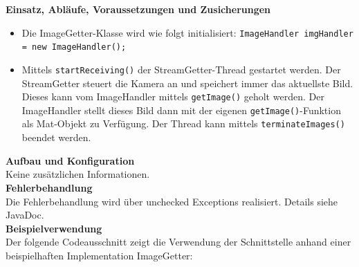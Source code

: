 \noindent
\textbf{Einsatz, Abläufe, Voraussetzungen und Zusicherungen}
\begin{itemize}
	\item{Die ImageGetter-Klasse wird wie folgt initialisiert: 
        \verb?ImageHandler imgHandler = new ImageHandler();? }
	\item{Mittels \verb?startReceiving()? der StreamGetter-Thread gestartet 
        werden. Der StreamGetter steuert die Kamera an und speichert immer das 
        aktuellste Bild. Dieses kann vom ImageHandler mittels 
        \verb?getImage()? geholt werden. Der ImageHandler stellt dieses Bild 
        dann mit der eigenen \verb?getImage()?-Funktion als Mat-Objekt zu 
        Verfügung. Der Thread kann mittels \verb?terminateImages()? beendet 
        werden.}
\end{itemize}

\noindent
\textbf{Aufbau und Konfiguration}  \\
Keine zusätzlichen Informationen. \\

\noindent
\textbf{Fehlerbehandlung} \\
Die Fehlerbehandlung wird über unchecked Exceptions realisiert. Details siehe JavaDoc. \\

\noindent
\textbf{Beispielverwendung} \\
Der folgende Codeausschnitt zeigt die Verwendung der Schnittstelle anhand einer beispielhaften Implementation ImageGetter: \\

